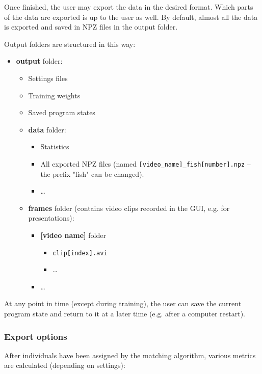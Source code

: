 \documentclass[9pt,lineno]{elife}
\begin{document}
\begin{appendixbox}
Once finished, the user may export the data in the desired format. Which parts of the data are exported is up to the user as well. By default, almost all the data is exported and saved in NPZ files in the output folder.

Output folders are structured in this way:

\begin{itemize}
\item \textbf{output} folder:
    \begin{itemize}
        \item Settings files
        \item Training weights
        \item Saved program states
        \item \textbf{data} folder:
        \begin{itemize}
            \item Statistics
            \item All exported NPZ files (named \texttt{[video\_name]\_fish[number].npz} -- the prefix "fish" can be changed).
            \item \dots
        \end{itemize}
        \item \textbf{frames} folder (contains video clips recorded in the GUI, e.g. for presentations):
        \begin{itemize}
            \item \textbf{[video name]} folder
            \begin{itemize}
                \item \texttt{clip[index].avi}
                \item \dots
            \end{itemize}
            \item \dots
        \end{itemize}
    \end{itemize}
\end{itemize}

At any point in time (except during training), the user can save the current program state and return to it at a later time (e.g. after a computer restart).

\subsubsection{Export options}

After individuals have been assigned by the matching algorithm, various metrics are calculated (depending on settings):


\end{appendixbox}
\end{document}
